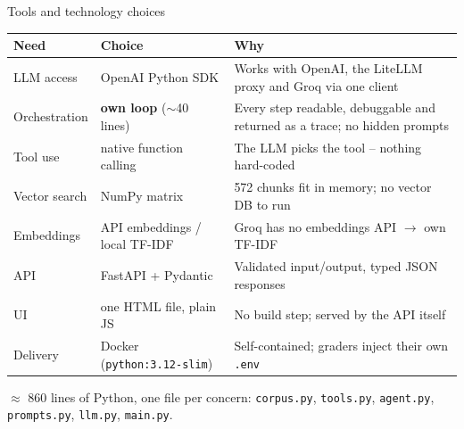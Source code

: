 \documentclass[aspectratio=169,11pt]{beamer}
\newcommand{\file}[1]{\texttt{\small #1}}
\begin{document}
\begin{frame}{Tools and technology choices}
  \footnotesize
  \renewcommand{\arraystretch}{1.12}
  \begin{tabularx}{\textwidth}{@{}l l X@{}}
    \toprule
    \textbf{Need} & \textbf{Choice} & \textbf{Why} \\
    \midrule
    LLM access & OpenAI Python SDK & Works with OpenAI, the LiteLLM proxy and Groq via one client \\
    Orchestration & \textbf{own loop} ($\sim$40 lines) & Every step readable, debuggable and returned as a trace; no hidden prompts \\
    Tool use & native function calling & The LLM picks the tool -- nothing hard-coded \\
    Vector search & NumPy matrix & 572 chunks fit in memory; no vector DB to run \\
    Embeddings & API embeddings / local TF-IDF & Groq has no embeddings API $\rightarrow$ own TF-IDF \\
    API & FastAPI + Pydantic & Validated input/output, typed JSON responses \\
    UI & one HTML file, plain JS & No build step; served by the API itself \\
    Delivery & Docker (\texttt{python:3.12-slim}) & Self-contained; graders inject their own \texttt{.env} \\
    \bottomrule
  \end{tabularx}
  \vspace{0.5em}

  {\color{grey}\footnotesize $\approx$ 860 lines of Python, one file per concern: \file{corpus.py}, \file{tools.py}, \file{agent.py}, \file{prompts.py}, \file{llm.py}, \file{main.py}.}
\end{frame}
\end{document}
